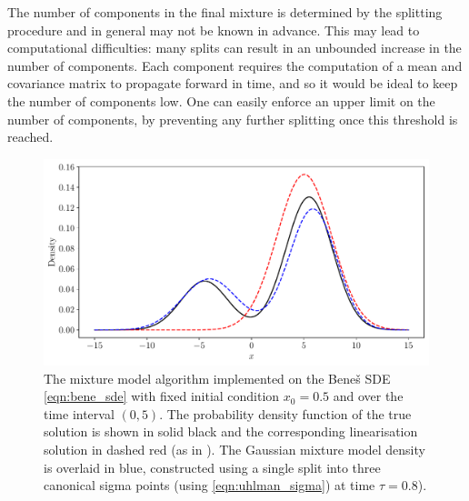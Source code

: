 The number of components in the final mixture is determined by the splitting procedure and in general may not be known in advance.
This may lead to computational difficulties: many splits can result in an unbounded increase in the number of components.
Each component requires the computation of a mean and covariance matrix to propagate forward in time, and so it would be ideal to keep the number of components low.
One can easily enforce an upper limit on the number of components, by preventing any further splitting once this threshold is reached.

\begin{figure}[t]
	\centering
	\includegraphics[width=\textwidth]{chp05_gmm/figures/bene_final_gmm}
	\caption{The mixture model algorithm implemented on the Bene\v{s} SDE \cref{eqn:bene_sde} with fixed initial condition \(x_0 = 0.5\) and over the time interval \((0,5)\).
		The probability density function of the true solution is shown in solid black and the corresponding linearisation solution in dashed red (as in ).
		The Gaussian mixture model density is overlaid in blue, constructed using a single split into three canonical sigma points (using \cref{eqn:uhlman_sigma}) at time \(\tau = 0.8\)).}
	\label{fig:bene_gmm}
\end{figure}


